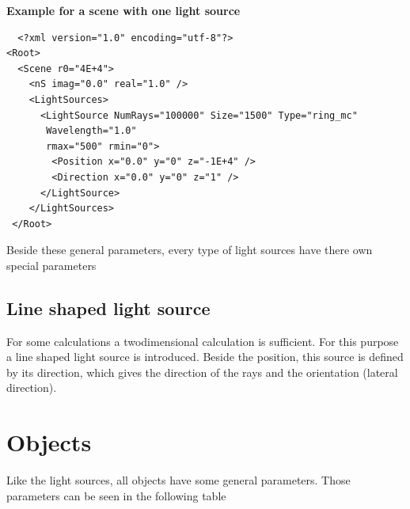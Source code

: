 \documentclass[a4paper,html,11pt,openany]{book}
\begin{document}
\vspace{1em} 
 \textbf{Example for a scene with one light source}
 \lstset{language=XML}
 \begin{lstlisting}
  <?xml version="1.0" encoding="utf-8"?>
<Root>
  <Scene r0="4E+4">
    <nS imag="0.0" real="1.0" />
    <LightSources>
      <LightSource NumRays="100000" Size="1500" Type="ring_mc"
       Wavelength="1.0"
       rmax="500" rmin="0">
        <Position x="0.0" y="0" z="-1E+4" />
        <Direction x="0.0" y="0" z="1" />
      </LightSource>
    </LightSources>
 </Root>
 \end{lstlisting}
 Beside these general parameters, every type of light sources have there own special parameters

\subsection{Line shaped light source}
For some calculations a twodimensional calculation is sufficient. For this purpose a line shaped light source is introduced. Beside the position, this source is defined by its direction, which gives the direction of the rays and the orientation (lateral direction). 

 \section{Objects}
 Like the light sources, all objects have some general parameters. Those parameters can be seen in the following table
 
\end{document}
